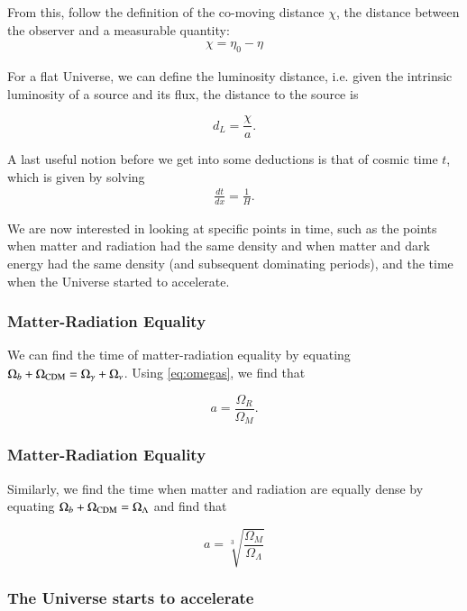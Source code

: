 \documentclass{aa}
\begin{document}
From this, follow the definition of the co-moving distance $\chi$, the distance between the observer and a measurable quantity:
\begin{align}
\chi = \eta_0 - \eta
\end{align}

For a flat Universe, we can define the luminosity distance, i.e. given the intrinsic luminosity of a source and its flux, the distance to the source is

\begin{equation}
    d_L = \frac{\chi}{a}.
\end{equation}

A last useful notion before we get into some deductions is that of cosmic time $t$, which is given by solving
\begin{align}
\label{eq:t-ode}
\frac{dt}{dx} = \frac{1}{H}.
\end{align}

We are now interested in looking at specific points in time, such as the points when matter and radiation had the same density and when matter and dark energy had the same density (and subsequent dominating periods), and the time when the Universe started to accelerate.

\subsubsection{Matter-Radiation Equality}

We can find the time of matter-radiation equality by equating $
\Omega_b + \Omega_{\rm CDM} = \Omega_\gamma + \Omega_{\nu}$. Using \eqref{eq:omegas}, we find that

\begin{equation}
    a = \frac{\Omega_R}{\Omega_M}.
\end{equation}

\subsubsection{Matter-Radiation Equality}

Similarly, we find the time when matter and radiation are equally dense by equating $\Omega_b + \Omega_{\rm CDM} = \Omega_{\Lambda}$ and find that

\begin{equation}
    a = \sqrt[3]{\frac{\Omega_M}{\Omega_{\Lambda}}}
\end{equation}

\subsubsection{The Universe starts to accelerate}
\end{document}
